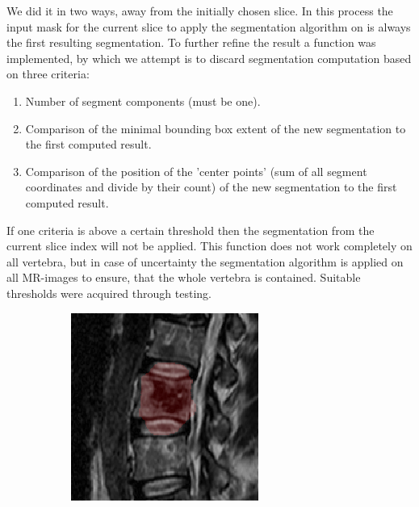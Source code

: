 \documentclass{article}
\begin{document}
{    We did it in two ways, away from the initially chosen slice. In this process the input mask for the current slice to apply the segmentation algorithm on is always the first resulting segmentation. To further refine the result a function was implemented, by which we attempt is to discard segmentation computation based on three criteria:
    \begin{enumerate}
    	\item Number of segment components (must be one).
    	\item Comparison of the minimal bounding box extent of the new segmentation to the first computed result.
    	\item Comparison of the position of the 'center points' (sum of all segment coordinates and divide by their count) of the new segmentation to the first computed result. 
    \end{enumerate}
	If one criteria is above a certain threshold then the segmentation from the current slice index will not be applied. This function does not work completely on all vertebra, but in case of uncertainty the segmentation algorithm is applied on all MR-images to ensure, that the whole vertebra is contained. Suitable thresholds were acquired through testing.\\
    \begin{figure}[h]
      \centering
      \begin{subfigure}[t]{0.45\linewidth}
        \centering
        \includegraphics[scale=1.4]{VertebraSegmentationExample_1.png}
        

\end{subfigure}
\end{figure}}
\end{document}
